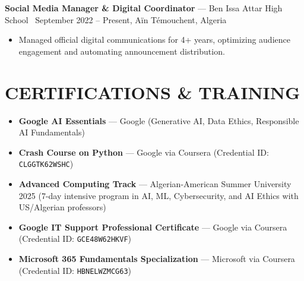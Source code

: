 \documentclass[10pt, letterpaper]{article}
\newcommand{\entry}[4]{%
  \noindent\textbf{#1} --- #3 \textbar\ #2, #4\par
  \vspace{2pt}
}
\newcommand{\resumeItem}[1]{\item #1}
\begin{document}
\entry{Social Media Manager \& Digital Coordinator}{September 2022 -- Present}{Ben Issa Attar High School}{Aïn Témouchent, Algeria}
\begin{itemize}
  \resumeItem{Managed official digital communications for 4+ years, optimizing audience engagement and automating announcement distribution.}
\end{itemize}

\section{CERTIFICATIONS \& TRAINING}
\begin{itemize}
  \resumeItem{\textbf{Google AI Essentials} --- Google (Generative AI, Data Ethics, Responsible AI Fundamentals)}
  \resumeItem{\textbf{Crash Course on Python} --- Google via Coursera (Credential ID: \texttt{CLGGTK62WSHC})}
  \resumeItem{\textbf{Advanced Computing Track} --- Algerian-American Summer University 2025 (7-day intensive program in AI, ML, Cybersecurity, and AI Ethics with US/Algerian professors)}
  \resumeItem{\textbf{Google IT Support Professional Certificate} --- Google via Coursera (Credential ID: \texttt{GCE48W62HKVF})}
  \resumeItem{\textbf{Microsoft 365 Fundamentals Specialization} --- Microsoft via Coursera (Credential ID: \texttt{HBNELWZMCG63})}
\end{itemize}
\end{document}
